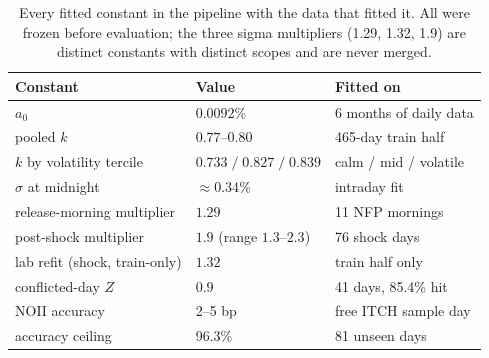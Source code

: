 \begin{table}[h]
\centering
\caption{Every fitted constant in the pipeline with the data that fitted
it. All were frozen before evaluation; the three sigma multipliers (1.29,
1.32, 1.9) are distinct constants with distinct scopes and are never
merged.}
\label{tab:fitted_constants}
\small
\begin{tabular}{lll}
\toprule
Constant & Value & Fitted on \\
\midrule
$a_0$ & $0.0092\%$ & 6 months of daily data \\
pooled $k$ & $0.77$--$0.80$ & 465-day train half \\
$k$ by volatility tercile & $0.733\;/\;0.827\;/\;0.839$ & calm / mid / volatile \\
$\sigma$ at midnight & $\approx 0.34\%$ & intraday fit \\
release-morning multiplier & $1.29$ & 11 NFP mornings \\
post-shock multiplier & $1.9$ (range $1.3$--$2.3$) & 76 shock days \\
lab refit (shock, train-only) & $1.32$ & train half only \\
conflicted-day $Z$ & $0.9$ & 41 days, 85.4\% hit \\
NOII accuracy & 2--5 bp & free ITCH sample day \\
accuracy ceiling & 96.3\% & 81 unseen days \\
\bottomrule
\end{tabular}
\end{table}
